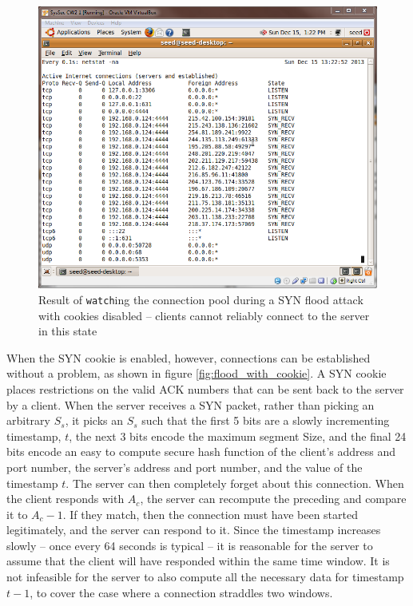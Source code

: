 \begin{figure}[h]
    \centering \includegraphics[width=.7\linewidth]{images/syn_flood_during.png}
    \caption{Result of {\tt watch}ing the connection pool during a SYN flood attack with cookies disabled -- clients
    cannot reliably connect to the server in this state}
    \label{fig:flood_no_cookie}
\end{figure}

When the SYN cookie is enabled, however, connections can be established without a problem, as shown in figure
\ref{fig:flood_with_cookie}. A SYN cookie places restrictions on the valid ACK numbers that can be sent back to the
server by a client. When the server receives a SYN packet, rather than picking an arbitrary $S_s$, it picks an $S_s$
such that the first 5 bits are a slowly incrementing timestamp, $t$, the next 3 bits encode the maximum segment Size,
and the final 24 bits encode an easy to compute secure hash function of the client's address and port number, the
server's address and port number, and the value of the timestamp $t$. The server can then completely forget about this
connection. When the client responds with $A_c$, the server can recompute the preceding and compare it to $A_c-1$. If
they match, then the connection must have been started legitimately, and the server can respond to it. Since the
timestamp increases slowly -- once every 64 seconds is typical -- it is reasonable for the server to
assume that the client will have responded within the same time window. It is not infeasible for the server to also
compute all the necessary data for timestamp $t-1$, to cover the case where a connection straddles two windows.

